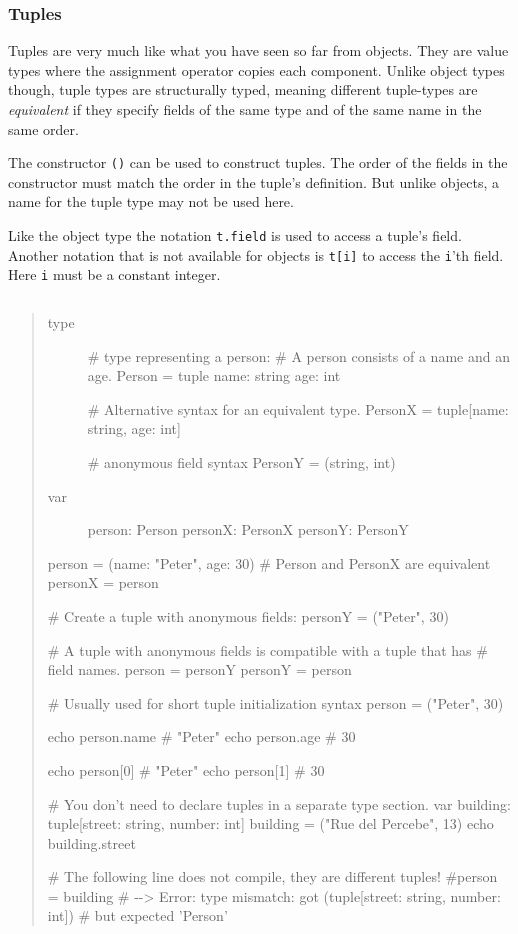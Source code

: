 \hypertarget{tuples}{%
\subsubsection{Tuples}\label{tuples}}

Tuples are very much like what you have seen so far from objects. They
are value types where the assignment operator copies each component.
Unlike object types though, tuple types are structurally typed, meaning
different tuple-types are \emph{equivalent} if they specify fields of
the same type and of the same name in the same order.

The constructor \texttt{()} can be used to construct tuples. The order
of the fields in the constructor must match the order in the tuple's
definition. But unlike objects, a name for the tuple type may not be
used here.

Like the object type the notation \texttt{t.field} is used to access a
tuple's field. Another notation that is not available for objects is
\texttt{t{[}i{]}} to access the \texttt{i}'th field. Here \texttt{i}
must be a constant integer.

\begin{verbatim}
\end{verbatim}

\begin{quote}
\begin{description}
\item[type]
\# type representing a person: \# A person consists of a name and an
age. Person = tuple name: string age: int

\# Alternative syntax for an equivalent type. PersonX = tuple{[}name:
string, age: int{]}

\# anonymous field syntax PersonY = (string, int)
\item[var]
person: Person personX: PersonX personY: PersonY
\end{description}

person = (name: "Peter", age: 30) \# Person and PersonX are equivalent
personX = person

\# Create a tuple with anonymous fields: personY = ("Peter", 30)

\# A tuple with anonymous fields is compatible with a tuple that has \#
field names. person = personY personY = person

\# Usually used for short tuple initialization syntax person = ("Peter",
30)

echo person.name \# "Peter" echo person.age \# 30

echo person{[}0{]} \# "Peter" echo person{[}1{]} \# 30

\# You don't need to declare tuples in a separate type section. var
building: tuple{[}street: string, number: int{]} building = ("Rue del
Percebe", 13) echo building.street

\# The following line does not compile, they are different tuples!
\#person = building \# -\/-\textgreater{} Error: type mismatch: got
(tuple{[}street: string, number: int{]}) \# but expected 'Person'
\end{quote}

